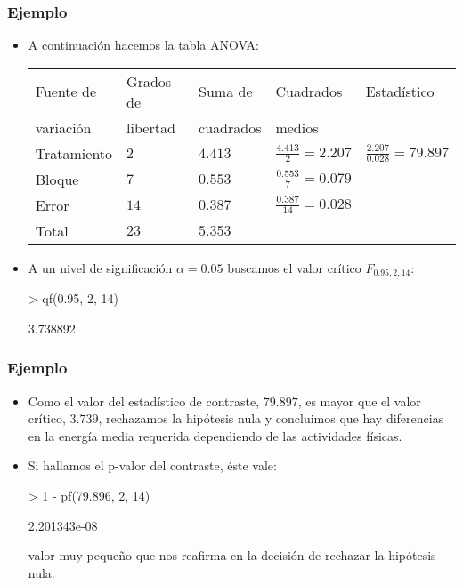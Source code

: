 \begin{frame}[fragile]
\frametitle{Ejemplo}
\begin{itemize}
\item<2-> A continuación hacemos la tabla ANOVA:
{\footnotesize\begin{center}
\begin{tabular}{|l@{}|l@{}|l@{}|l@{}|l|}
\hline
Fuente de&Grados de&Suma de&Cuadrados&Estadístico\\
variación&libertad&cuadrados&medios&\\\hline
Tratamiento&$2$&$4.413$&$\frac{4.413}{2}=2.207$&$\frac{2.207}{0.028}=79.897$\\
Bloque&$7$&$0.553$&$\frac{0.553}{7}=0.079$&\\
Error&$14$&$0.387$&$\frac{0.387}{14}=0.028$&\\\hline
Total&$23$&$5.353$&&\\\hline
\end{tabular}
\end{center}}
\item<3-> A un nivel de significación $\alpha =0.05$ buscamos el valor crítico $F_{0.95,2,14}$:

\begin{Schunk}
\begin{Sinput}
> qf(0.95, 2, 14)
\end{Sinput}
\begin{Soutput}
[1] 3.738892
\end{Soutput}
\end{Schunk}

\end{itemize}
\end{frame}
\begin{frame}[fragile]
\frametitle{Ejemplo}
\begin{itemize}
\item<2-> Como el valor del estadístico de contraste, $79.897$, es mayor que el valor crítico, $3.739$, rechazamos la hipótesis nula y concluimos que hay diferencias en la energía media requerida dependiendo de las actividades físicas.
\item<3-> Si hallamos el p-valor del contraste, éste vale:

\begin{Schunk}
\begin{Sinput}
> 1 - pf(79.896, 2, 14)
\end{Sinput}
\begin{Soutput}
[1] 2.201343e-08
\end{Soutput}
\end{Schunk}

valor muy pequeño que nos reafirma en la decisión de rechazar la hipótesis nula.
\end{itemize}
\end{frame}
